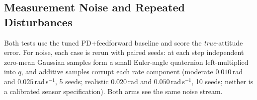 \documentclass[letterpaper, 10 pt, conference]{ieeeconf}
\begin{document}


\subsection{Measurement Noise and Repeated Disturbances}
\label{sec:noise}
Both tests use the tuned PD+feedforward baseline and score the \emph{true}-attitude error. For noise, each case is rerun with paired seeds: at each step independent zero-mean Gaussian samples form a small Euler-angle quaternion left-multiplied into $q$, and additive samples corrupt each rate component (moderate $0.010$\,rad and $0.025$\,rad\,s$^{-1}$, 5 seeds; realistic $0.020$\,rad and $0.050$\,rad\,s$^{-1}$, 10 seeds; neither is a calibrated sensor specification). Both arms see the same noise stream.
\end{document}

